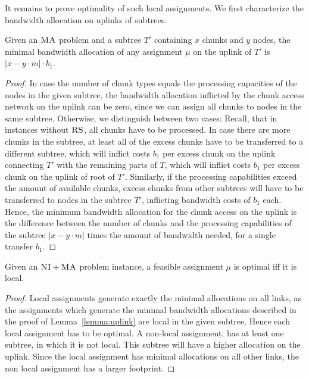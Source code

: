 \documentclass[9pt]{sigcomm-alternate}
\newcommand{\MaFactor}{m}
\newcommand{\VmChunkAssignment}{\mu}
\newcommand{\CC}{\textsc{NI}}
\newcommand{\RS}{\textsc{RS}}
\newcommand{\MA}{\textsc{MA}}
\newcommand{\Tree}{\ensuremath{T}}
\newcommand{\CostTrans}{\ensuremath{b_1}}
\begin{document}
It remains to prove optimality of such local assignments.
We first characterize the bandwidth allocation on uplinks of subtrees.
\begin{lemma}\label{lem:uplink-alloc}
Given an $\MA$ problem and a subtree $\Tree'$
containing $x$
chunks and $y$ nodes, the minimal bandwidth allocation of any
assignment
$\VmChunkAssignment$ on the uplink of $\Tree'$ is $|x-y\cdot\MaFactor|\cdot
\CostTrans$.
\label{lemma:uplink}
\end{lemma}
\begin{proof}
In case the number of chunk types equals the processing capacities of the
nodes in the given subtree,
the bandwidth allocation inflicted by the chunk access network on the uplink can
be
zero, since we can assign all chunks to nodes in the same subtree.
Otherwise, we distinguish between two cases: Recall, that in instances
without $\RS$, all chunks have to be processed. In case
there are more chunks in the subtree, at least all of the excess chunks have to
be transferred to a different subtree, which will
inflict costs $\CostTrans$ per excess chunk on the uplink connecting $\Tree'$
with the
remaining parts of $\Tree$, which will inflict costs $\CostTrans$ per excess chunk on the uplink of root of $\Tree'$.
 Similarly, if the processing capabilities exceed the
amount of
available chunks, excess chunks from other subtrees will have to be transferred
to
nodes in the subtree $\Tree'$, inflicting bandwidth costs of $\CostTrans$ each.
Hence, the minimum bandwidth allocation for the chunk access on the uplink
is the difference between the number of chunks and the processing capabilities
of the subtree $|x-y\cdot\MaFactor|$ times the amount of bandwidth needed,
for a single transfer $\CostTrans$.
\end{proof}


\begin{theorem}
Given an $\CC+\MA$ problem instance, a feasible assignment $\VmChunkAssignment$
is optimal iff it is local.
\label{thm:local_optimal}
\end{theorem}

\begin{proof}
Local assignments generate exactly the minimal allocations on all links, as
 the assignments which generate the minimal bandwidth allocations
described in
the proof of
Lemma~\ref{lemma:uplink} are local in the given subtree. Hence
each local assignment has to be optimal. A non-local assignment, has at least
one subtree, in which it is not local. This subtree will have a higher
allocation on the uplink. Since the local assignment has minimal allocations
on all other links, the non local assignment has a larger footprint.
\end{proof}
\end{document}

